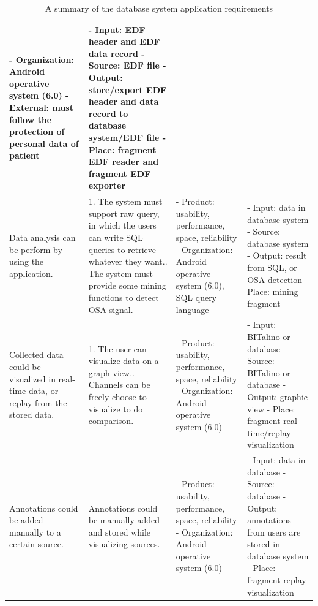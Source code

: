 \begin{table}
\begin{adjustwidth}{-1.5cm}{}
\begin{center}
\begin{tabular}{ |p{2.4cm}|p{5.5cm}|p{3.3cm}|p{4.3cm}|}
 - Organization: Android operative system (6.0)\newline
 - External: must follow the protection of personal data of patient&
 - Input: EDF header and EDF data record\newline
 - Source: EDF file\newline
 - Output: store/export EDF header and data record to database system/EDF file\newline
 - Place: fragment EDF reader and fragment EDF exporter\\
 \hline
 Data analysis can be perform by using the application.&
 1. The system must support raw query, in which the users can write SQL queries to retrieve whatever they want.\newline
 2. The system must provide some mining functions to detect OSA signal.&
 - Product: usability, performance, space, reliability\newline
 - Organization: Android operative system (6.0), SQL query language&
 - Input: data in database system\newline
 - Source: database system\newline
 - Output: result from SQL, or OSA detection\newline
 - Place: mining fragment\\
 \hline
 Collected data could be visualized in real-time data, or replay from the stored data.&
 1. The user can visualize data on a graph view.\newline
 2. Channels can be freely choose to visualize to do comparison.&
 - Product: usability, performance, space, reliability\newline
 - Organization: Android operative system (6.0)&
 - Input: BITalino or database\newline
 - Source: BITalino or database\newline
 - Output: graphic view\newline
 - Place: fragment real-time/replay visualization\\
 \hline
 Annotations could be added manually to a certain source.&
 Annotations could be manually added and stored while visualizing sources.&
 - Product: usability, performance, space, reliability\newline
 - Organization: Android operative system (6.0)&
 - Input: data in database\newline
 - Source: database\newline
 - Output: annotations from users are stored in database system\newline
 - Place: fragment replay visualization\\
 \hline
\end{tabular}
\end{center}
\end{adjustwidth}
\caption{A summary of the database system application requirements}
\label{tab:userrequirementAPP}
\end{table}
